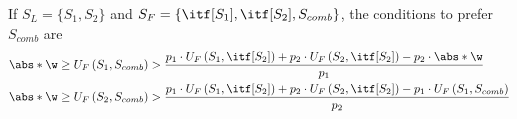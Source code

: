 \begin{theorem}\label{theorems: when combined response is better than combination of responses - two strategies}
If $S_L=\lbrace S_1, S_2 \rbrace$ and $S_F=\lbrace \itf[S_1], \itf[S_2], S_{comb} \rbrace$, the conditions to prefer $S_{comb}$ are 
\begin{equation}
    \begin{aligned}
        \abs*{\w} \geq U_F\left(S_1,S_{comb}\right) &> \frac{p_1 \cdot U_F\left(S_1,\itf[S_2]\right) + p_2 \cdot U_F\left(S_2,\itf[S_2]\right) - p_2\cdot \abs*{\w}}{p_1} \\
        \abs*{\w} \geq U_F\left(S_2,S_{comb}\right) &> \frac{p_1 \cdot U_F\left(S_1,\itf[S_2]\right) + p_2 \cdot U_F\left(S_2,\itf[S_2]\right) - p_1 \cdot U_F\left(S_1,S_{comb}\right)}{p_2} 
    \end{aligned}
\end{equation}
\end{theorem}


